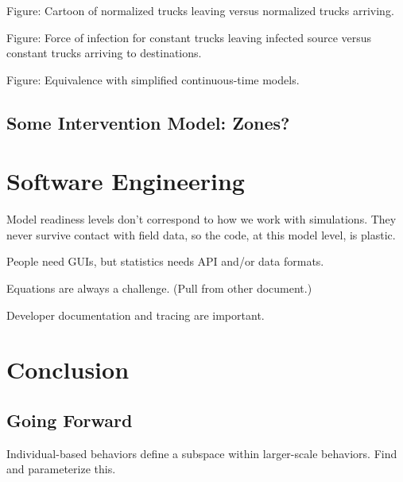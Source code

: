 \documentclass{article}
\begin{document}
Figure: Cartoon of normalized trucks leaving versus normalized
        trucks arriving.

Figure: Force of infection for constant trucks leaving infected source
        versus constant trucks arriving to destinations.

Figure: Equivalence with simplified continuous-time models.


\subsection{Some Intervention Model: Zones?}


\section{Software Engineering}
Model readiness levels don't correspond to how we work with
simulations. They never survive contact with field data,
so the code, at this model level, is plastic.

People need GUIs, but statistics needs API and/or data formats.

Equations are always a challenge. (Pull from other document.)

Developer documentation and tracing are important.

\section{Conclusion}
\subsection{Going Forward}
Individual-based behaviors define a subspace within larger-scale
behaviors. Find and parameterize this.
\end{document}
